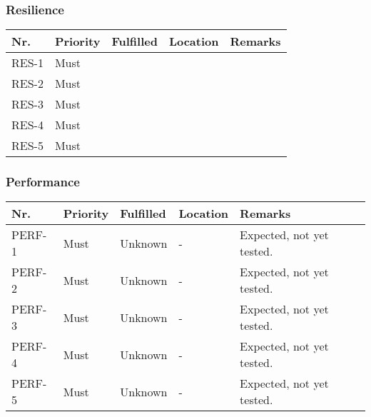 \subsubsection{Resilience}
\begin{table}[H]
	\begin{tabular}{lllll}
						    
		Nr.   & Priority & Fulfilled & Location & Remarks \\ \hline
		RES-1 & Must     & ~        & ~         & ~       \\ 
		RES-2 & Must     & ~        & ~         & ~       \\ 
		RES-3 & Must     & ~        & ~         & ~       \\ 
		RES-4 & Must     & ~        & ~         & ~       \\ 
		RES-5 & Must     & ~        & ~         & ~       \\
						
	\end{tabular}
\end{table}

\subsubsection{Performance}
\begin{table}[H]
	\begin{tabular}{lllll}
						    
		Nr.    & Priority & Fulfilled & Location & Remarks \\ \hline
		PERF-1 & Must     & Unknown  & -         & Expected, not yet tested. \\
		PERF-2 & Must     & Unknown  & -         & Expected, not yet tested. \\
		PERF-3 & Must     & Unknown  & -         & Expected, not yet tested. \\
		PERF-4 & Must     & Unknown  & -         & Expected, not yet tested. \\
		PERF-5 & Must     & Unknown  & -         & Expected, not yet tested. \\
						
	\end{tabular}
\end{table}

